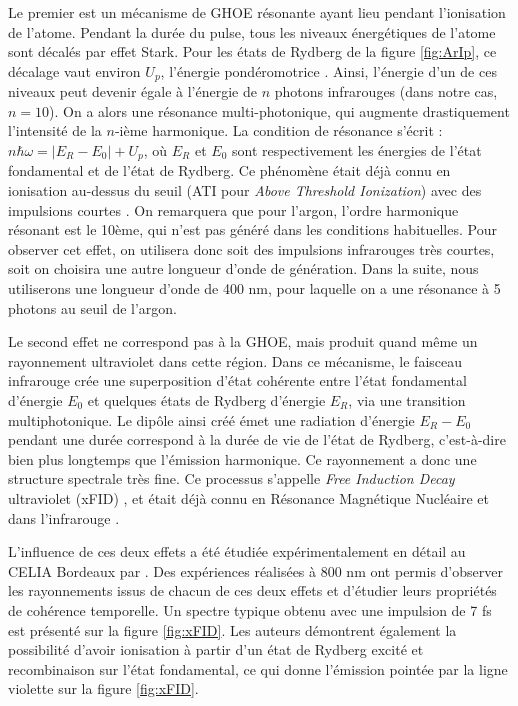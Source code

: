 Le premier est un mécanisme de GHOE résonante ayant lieu pendant l'ionisation de l'atome. Pendant la durée du pulse, tous les niveaux énergétiques de l'atome sont décalés par effet Stark. Pour les états de Rydberg de la figure \ref{fig:ArIp}, ce décalage vaut environ $U_p$, l'énergie pondéromotrice . Ainsi, l'énergie d'un de ces niveaux peut devenir égale à l'énergie de $n$ photons infrarouges (dans notre cas, $n=10$). On a alors une résonance multi-photonique, qui augmente drastiquement l'intensité de la $n$-ième harmonique. La condition de résonance s'écrit : $n\hbar\omega = |E_R-E_0|+U_p$, où $E_R$ et $E_0$ sont respectivement les énergies de l'état fondamental et de l'état de Rydberg. Ce phénomène était déjà connu en ionisation au-dessus du seuil (ATI pour \textit{Above Threshold Ionization}) avec des impulsions courtes . On remarquera que pour l'argon, l'ordre harmonique résonant est le 10ème, qui n'est pas généré dans les conditions habituelles. Pour observer cet effet, on utilisera donc soit des impulsions infrarouges très courtes, soit on choisira une autre longueur d'onde de génération. Dans la suite, nous utiliserons une longueur d'onde de 400 nm, pour laquelle on a une résonance à 5 photons au seuil de l'argon.

Le second effet ne correspond pas à la GHOE, mais produit quand même un rayonnement ultraviolet dans cette région. Dans ce mécanisme, le faisceau infrarouge crée une superposition d'état cohérente entre l'état fondamental d'énergie $E_0$ et quelques états de Rydberg d'énergie $E_R$, via une transition multiphotonique. Le dipôle ainsi créé émet une radiation d'énergie $E_R-E_0$ pendant une durée correspond à la durée de vie de l'état de Rydberg, c'est-à-dire bien plus longtemps que l'émission harmonique. Ce rayonnement a donc une structure spectrale très fine. Ce processus s'appelle \textit{Free Induction Decay} ultraviolet (xFID) , et était déjà connu en Résonance Magnétique Nucléaire  et dans l'infrarouge . 

L'influence de ces deux effets a été étudiée expérimentalement en détail au CELIA Bordeaux par . Des expériences réalisées à 800 nm ont permis d'observer les rayonnements issus de chacun de ces deux effets et d'étudier leurs propriétés de cohérence temporelle. Un spectre typique obtenu avec une impulsion de 7 fs est présenté sur la figure \ref{fig:xFID}. Les auteurs démontrent également la possibilité d'avoir ionisation à partir d'un état de Rydberg excité et recombinaison sur l'état fondamental, ce qui donne l'émission pointée par la ligne violette sur la figure \ref{fig:xFID}. 

